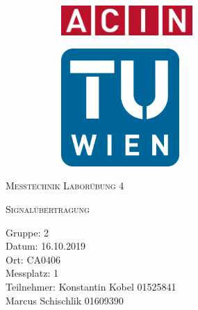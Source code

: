 \documentclass[a4paper,12pt]{article}
\begin{document}
	\begin{titlepage}
		\begin{figure}[h]
			\begin{subfigure}{1cm}
				\includegraphics[width=5cm]{img/acinlogo}
			\end{subfigure}
			\hspace{10cm}
			\begin{subfigure}{6cm}
				\includegraphics[width=4.5cm]{img/TUlogo}
			\end{subfigure}
		\end{figure}
		\centering
		\bigskip \bigskip \bigskip \bigskip \bigskip
		\scshape\Huge Messtechnik Laborübung 4\par
		\vspace{1cm}
		\scshape\Large  Signalübertragung\par
		\vspace{2cm}
		\raggedright
		\large Gruppe: 2 \\
		Datum: 16.10.2019 \\
		Ort: CA0406 \\
		Messplatz: 1 \\
		Teilnehmer: Konstantin Kobel 01525841\\
		\hspace{3.25cm}Marcus Schischlik 01609390 \\
		\vfill
		\large \par
	\end{titlepage}
\end{document}
